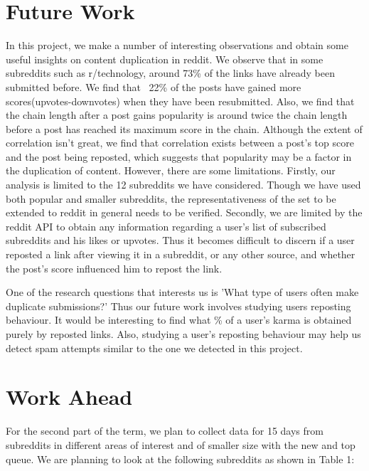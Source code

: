 \documentclass{article} %
\begin{document}
\section{Future Work}
In this project, we make a number of interesting observations and obtain some useful insights on content duplication in reddit. We observe that in some subreddits such as r/technology, around 73\% of the links have already been submitted before. We find that ~22\% of the posts have gained more scores(upvotes-downvotes) when they have been resubmitted. Also, we find that the chain length after a post gains popularity is around twice the chain length before a post has reached its maximum score in the chain. Although the extent of correlation isn't great, we find that correlation exists between a post's top score and the post being reposted, which suggests that popularity may be a factor in the duplication of content. However, there are some limitations. Firstly, our analysis is limited to the 12 subreddits we have considered. Though we have used both popular and smaller subreddits, the representativeness of the set to be extended to reddit in general needs to be verified. Secondly, we are limited by the reddit API to obtain any information regarding a user's list of subscribed subreddits and his likes or upvotes. Thus it becomes difficult to discern if a user reposted a link after viewing it in a subreddit, or any other source, and whether the post's score influenced him to repost the link. 

One of the research questions that interests us is 'What type of users often make duplicate submissions?' Thus our future work involves studying users reposting behaviour. It would be interesting to find what \% of a user's karma is obtained purely by reposted links. Also, studying a user's reposting behaviour may help us detect spam attempts similar  to the one we detected in this project. 


\iffalse
\section{Work Ahead}
For the second part of the term, we plan to collect data for 15 days from subreddits in different areas of interest and of smaller size with the new and top queue. We are planning to look at the following subreddits as shown in Table 1:
\end{document}
